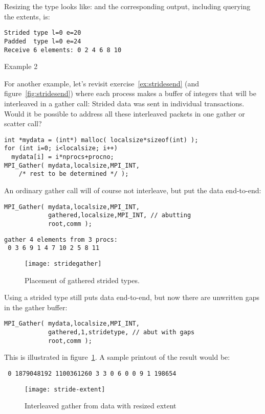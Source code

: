 Resizing the type looks like:
%
%
and the corresponding output,
including querying the extents,
is:
\begin{verbatim}
Strided type l=0 e=20
Padded  type l=0 e=24
Receive 6 elements: 0 2 4 6 8 10
\end{verbatim}

 {Example 2}

For another example, let's revisit exercise~\ref{ex:stridesend}
(and  figure~\ref{fig:stridesend})
where each process makes a
buffer of integers that will be interleaved in a gather call:
Strided data was sent in individual transactions.
Would it be possible to address all these interleaved packets in one
gather or scatter call?

\begin{lstlisting}
int *mydata = (int*) malloc( localsize*sizeof(int) );
for (int i=0; i<localsize; i++)
  mydata[i] = i*nprocs+procno;
MPI_Gather( mydata,localsize,MPI_INT,
    /* rest to be determined */ );
\end{lstlisting}

An ordinary gather call will of course not interleave, but
put the data end-to-end:
\begin{lstlisting}
MPI_Gather( mydata,localsize,MPI_INT,
            gathered,localsize,MPI_INT, // abutting
            root,comm );
\end{lstlisting}
\begin{verbatim}
gather 4 elements from 3 procs:
 0 3 6 9 1 4 7 10 2 5 8 11
\end{verbatim}

\begin{figure}
  \texttt{[image: stridegather]}
  \caption{Placement of gathered strided types.}
  \label{fig:stridegather}
\end{figure}
Using a strided type still puts data end-to-end, but now there
are unwritten gaps in the gather buffer:
\begin{lstlisting}
MPI_Gather( mydata,localsize,MPI_INT,
            gathered,1,stridetype, // abut with gaps
            root,comm );  
\end{lstlisting}
This is illustrated in figure~\ref{fig:stridegather}.
A sample printout of the result would be:
\begin{verbatim}
 0 1879048192 1100361260 3 3 0 6 0 0 9 1 198654
\end{verbatim}

\begin{figure}[ht]
  \texttt{[image: stride-extent]}
  \caption{Interleaved gather from data with resized extent}
  \label{fig:stride-extent}
\end{figure}

